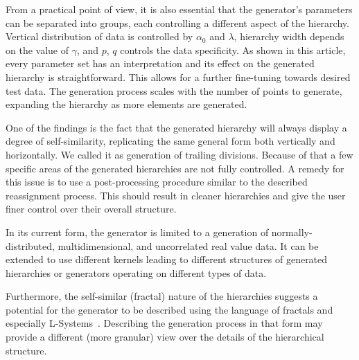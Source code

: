 \documentclass{article}
\begin{document}
	From a practical point of view, it is also essential that the generator's parameters can be separated into groups, each controlling a different aspect of the hierarchy. Vertical distribution of data is controlled by $\alpha_0$ and $\lambda$, hierarchy width depends on the value of $\gamma$, and $p$, $q$ controls the data specificity. As shown in this article, every parameter set has an interpretation and its effect on the generated hierarchy is straightforward. This allows for a further fine-tuning towards desired test data. The generation process scales with the number of points to generate, expanding the hierarchy as more elements are generated.
    
    One of the findings is the fact that the generated hierarchy will always display a degree of self-similarity, replicating the same general form both vertically and horizontally. We called it as generation of trailing divisions. Because of that a few specific areas of the generated hierarchies are not fully controlled. A remedy for this issue is to use a post-processing procedure similar to the described reassignment process. This should result in cleaner hierarchies and give the user finer control over their overall structure.
    
    In its current form, the generator is limited to a generation of normally-distributed, multidimensional, and uncorrelated real value data. It can be extended to use different kernels leading to different structures of generated hierarchies or generators operating on different types of data.
    
    Furthermore, the self-similar (fractal) nature of the hierarchies suggests a potential for the generator to be described using the language of fractals and especially L-Systems~\cite{prusinkiewicz2013lindenmayer}. Describing the generation process in that form may provide a different (more granular) view over the details of the hierarchical structure. 
	
\end{document}
